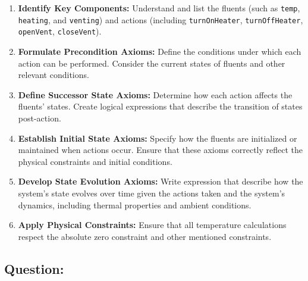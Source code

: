\documentclass{assignment}
\begin{document}
\begin{problem}
\begin{enumerate}
    \item \textbf{Identify Key Components:} Understand and list the fluents (such as \texttt{temp}, \texttt{heating}, and \texttt{venting}) and actions (including \texttt{turnOnHeater}, \texttt{turnOffHeater}, \texttt{openVent}, \texttt{closeVent}).
    \item \textbf{Formulate Precondition Axioms:} Define the conditions under which each action can be performed. Consider the current states of fluents and other relevant conditions.
    \item \textbf{Define Successor State Axioms:} Determine how each action affects the fluents' states. Create logical expressions that describe the transition of states post-action.
    \item \textbf{Establish Initial State Axioms:} Specify how the fluents are initialized or maintained when actions occur. Ensure that these axioms correctly reflect the physical constraints and initial conditions.
    \item \textbf{Develop State Evolution Axioms:} Write expression that describe how the system's state evolves over time given the actions taken and the system's dynamics, including thermal properties and ambient conditions.
    \item \textbf{Apply Physical Constraints:} Ensure that all temperature calculations respect the absolute zero constraint and other mentioned constraints.
\end{enumerate}
\subsection*{Question:}
\begin{figure}[h]
\centering
{}
\end{figure}
\end{problem}
\end{document}
